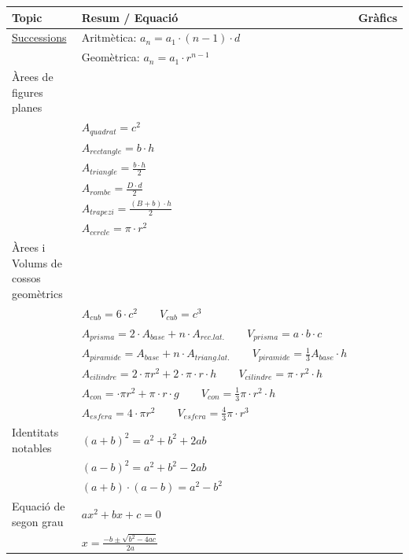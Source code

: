 \documentclass{article}
\begin{document}
\begin{center}
	\begin{longtable}{ | l |l|l|}
		\hline
		\cellcolor{gray}\textbf{Topic} & \cellcolor{gray}\textbf{Resum / Equació} &  \cellcolor{gray}\textbf{Gràfics} \\
		\hline
    \href{http://proyectodescartes.org/EDAD/materiales_didacticos/EDAD_3eso_cat_progressions-JS-LOMCE/index.htm}{Successions} & Aritmètica: $a_n=a_1 \cdot (n-1) \cdot d$ & \\
        & Geomètrica: $a_n=a_1 \cdot r^{n-1}$ & \\
        \hline
     Àrees de figures planes & & \\
     & $A_{quadrat}=c^2$ & \\
     & $A_{rectangle}=b\cdot h$ & \\
     & $A_{triangle}=\frac{b\cdot h}{2}$ & \\
     & $A_{rombe}=\frac{D\cdot d}{2}$ & \\
     & $A_{trapezi}=\frac{(B+b)\cdot h}{2}$ & \\
     & $A_{cercle}=\pi \cdot r^2$ & \\
     \hline
     Àrees i Volums de cossos geomètrics & & \\
     & $A_{cub}=6\cdot c^2 \qquad V_{cub}=c^3$ & \\
     & $A_{prisma}=2\cdot A_{base}+n\cdot A_{rec. lat.} \qquad V_{prisma}=a\cdot b \cdot c$ & \\
     & $A_{piramide}=A_{base}+n\cdot A_{triang. lat.} \qquad V_{piramide}=\frac{1}{3} A_{base} \cdot h$ & \\
     & $A_{cilindre}=2 \cdot \pi r^2+2\cdot \pi \cdot r \cdot h \qquad V_{cilindre}=\pi \cdot r^2 \cdot h$ & \\
     & $A_{con}=\cdot \pi r^2+ \pi \cdot r \cdot g \qquad V_{con}=\frac{1}{3}\pi \cdot r^2 \cdot h$ & \\
     & $A_{esfera}=4 \cdot \pi r^2 \qquad V_{esfera}=\frac{4}{3}\pi \cdot r^3$ & \\
     
     \hline   

    Identitats notables     &$(a+b)^2=a^2+b^2+2ab$ & \\
    & $(a-b)^2=a^2+b^2-2ab$ & \\
    & $(a+b)\cdot (a-b)=a^2-b^2$ & \\
        \hline
        Equació de segon grau     &$ax^2+bx+c=0$ & \\
        & $x=\frac{-b \pm \sqrt{b^2-4ac}}{2a}$ & \\
        

\end{longtable}
\end{center}
\end{document}
